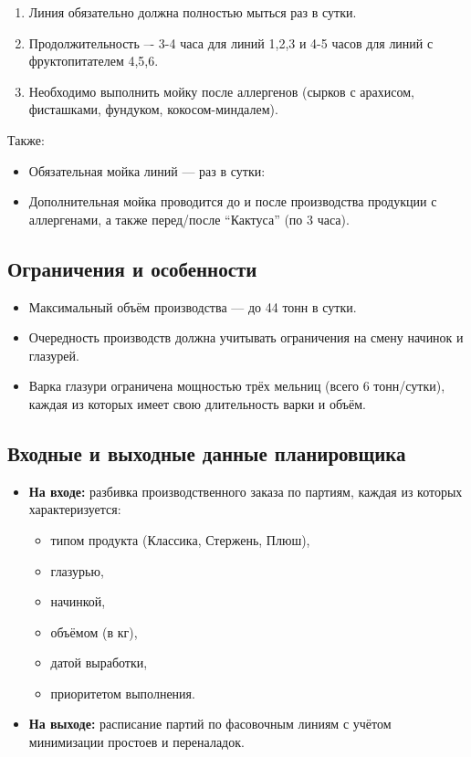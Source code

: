 \begin{enumerate}
  \item Линия обязательно должна полностью мыться раз в сутки.
  \item Продолжительность –- 3-4 часа для линий 1,2,3 и 4-5 часов для линий с фруктопитателем 4,5,6.
  \item Необходимо выполнить мойку после аллергенов (сырков с арахисом, фисташками, фундуком, кокосом-миндалем).
\end{enumerate}

Также:
\begin{itemize}
  \item Обязательная мойка линий — раз в сутки:
  \item Дополнительная мойка проводится до и после производства продукции с аллергенами, а также перед/после ``Кактуса'' (по 3 часа).
\end{itemize}

\subsection{Ограничения и особенности}
\begin{itemize}
  \item Максимальный объём производства — до 44 тонн в сутки.
  \item Очередность производств должна учитывать ограничения на смену начинок и глазурей.
  \item Варка глазури ограничена мощностью трёх мельниц (всего 6 тонн/сутки), каждая из которых имеет свою длительность варки и объём.
\end{itemize}

\subsection{Входные и выходные данные планировщика}
\begin{itemize}
  \item \textbf{На входе:} разбивка производственного заказа по партиям, каждая из которых характеризуется:
  \begin{itemize}
    \item типом продукта (Классика, Стержень, Плюш),
    \item глазурью,
    \item начинкой,
    \item объёмом (в кг),
    \item датой выработки,
    \item приоритетом выполнения.
  \end{itemize}
  \item \textbf{На выходе:} расписание партий по фасовочным линиям с учётом минимизации простоев и переналадок.
\end{itemize}

